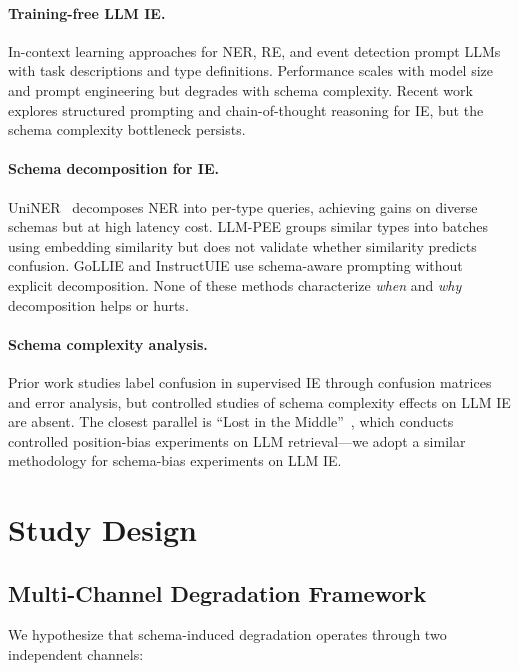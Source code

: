 \documentclass[11pt,a4paper]{article}
\begin{document}
\paragraph{Training-free LLM IE.}
In-context learning approaches for NER, RE, and event detection prompt LLMs with task descriptions and type definitions. Performance scales with model size and prompt engineering but degrades with schema complexity. Recent work explores structured prompting and chain-of-thought reasoning for IE, but the schema complexity bottleneck persists.

\paragraph{Schema decomposition for IE.}
UniNER~\citep{universal-ner} decomposes NER into per-type queries, achieving gains on diverse schemas but at high latency cost. LLM-PEE groups similar types into batches using embedding similarity but does not validate whether similarity predicts confusion. GoLLIE and InstructUIE use schema-aware prompting without explicit decomposition. None of these methods characterize \emph{when} and \emph{why} decomposition helps or hurts.

\paragraph{Schema complexity analysis.}
Prior work studies label confusion in supervised IE through confusion matrices and error analysis, but controlled studies of schema complexity effects on LLM IE are absent. The closest parallel is ``Lost in the Middle''~\citep{lost-in-middle}, which conducts controlled position-bias experiments on LLM retrieval---we adopt a similar methodology for schema-bias experiments on LLM IE.

\section{Study Design}
\label{sec:design}

\subsection{Multi-Channel Degradation Framework}

We hypothesize that schema-induced degradation operates through two independent channels:
\end{document}
